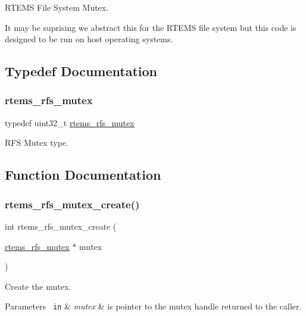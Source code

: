 R\+T\+E\+MS File System Mutex.

It may be suprising we abstract this for the R\+T\+E\+MS file system but this code is designed to be run on host operating systems. 

\subsection{Typedef Documentation}
\mbox{\label{rtems-rfs-mutex_8h_a5234b0b9f6a152769b4f405b76461a19}} 
\subsubsection{\texorpdfstring{rtems\_rfs\_mutex}{rtems\_rfs\_mutex}}
{\footnotesize\ttfamily typedef uint32\+\_\+t \mbox{\hyperlink{rtems-rfs-mutex_8h_a5234b0b9f6a152769b4f405b76461a19}{rtems\+\_\+rfs\+\_\+mutex}}}

R\+FS Mutex type. 

\subsection{Function Documentation}
\mbox{\label{rtems-rfs-mutex_8h_a4f5527fa74478729e066bbd75bca7bd6}} 
\subsubsection{\texorpdfstring{rtems\_rfs\_mutex\_create()}{rtems\_rfs\_mutex\_create()}}
{\footnotesize\ttfamily int rtems\+\_\+rfs\+\_\+mutex\+\_\+create (\begin{DoxyParamCaption}\item[{\mbox{\hyperlink{rtems-rfs-mutex_8h_a5234b0b9f6a152769b4f405b76461a19}{rtems\+\_\+rfs\+\_\+mutex}} $\ast$}]{mutex }\end{DoxyParamCaption})}



Create the mutex. 


\begin{DoxyParams}[1]{Parameters}
\mbox{\texttt{ in}}  & {\em mutex} & is pointer to the mutex handle returned to the caller.\\
\hline
\end{DoxyParams}

